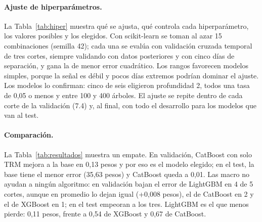 \documentclass[11pt,letterpaper]{article}
\begin{document}
\paragraph{Ajuste de hiperparámetros.} La Tabla~\ref{tab:hiper} muestra qué se ajusta, qué controla cada hiperparámetro, los valores posibles y los elegidos. Con scikit-learn \cite{sklearn} se toman al azar 15 combinaciones (semilla 42); cada una se evalúa con validación cruzada temporal de tres cortes, siempre validando con datos posteriores y con cinco días de separación, y gana la de menor error cuadrático. Los rangos favorecen modelos simples, porque la señal es débil y pocos días extremos podrían dominar el ajuste. Los modelos lo confirman: cinco de seis eligieron profundidad 2, todos una tasa de 0,05 o menos y entre 100 y 400 árboles. El ajuste se repite dentro de cada corte de la validación (7.4) y, al final, con todo el desarrollo para los modelos que van al test.

\begin{table}[!htbp]
\centering\footnotesize
\setlength{\tabcolsep}{3.5pt}
\caption{Hiperparámetros: qué controlan, valores posibles y valores elegidos en los modelos finales. Fijos: semilla 42, un hilo de cómputo y, en CatBoost, muestreo Bernoulli. La línea base no tiene hiperparámetros.}
\label{tab:hiper}
\resizebox{\textwidth}{!}{}
\end{table}

\paragraph{Comparación.} La Tabla~\ref{tab:resultados} muestra un empate. En validación, CatBoost con solo TRM mejora a la base en 0,13 pesos y por eso es el modelo elegido; en el test, la base tiene el menor error (35,63 pesos) y CatBoost queda a 0,01. Las macro no ayudan a ningún algoritmo: en validación bajan el error de LightGBM en 4 de 5 cortes, aunque en promedio lo dejan igual (+0,008 pesos), el de CatBoost en 2 y el de XGBoost en 1; en el test empeoran a los tres. LightGBM es el que menos pierde: 0,11 pesos, frente a 0,54 de XGBoost y 0,67 de CatBoost.

\begin{table}[!htbp]
\centering\footnotesize
\setlength{\tabcolsep}{4pt}
\caption{Resultados en validación (media $\pm$ desviación en 5 cortes, ver 7.4) y en el test. RMSE y MAE en pesos; $R^2$ sobre retornos. Macro mejora: cortes en que la versión con macro tiene menor RMSE que la de solo TRM. $\Delta$RMSE: diferencia con la línea base en el test. En negrita, el mejor de cada bloque.}
\label{tab:resultados}
\resizebox{\textwidth}{!}{}
\end{table}
\end{document}

